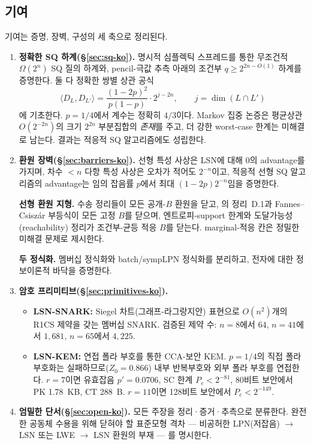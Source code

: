\documentclass[11pt,a4paper]{article}
\theoremstyle{plain}
\theoremstyle{definition}
\begin{document}
\subsection{기여}

기여는 증명, 장벽, 구성의 세 축으로 정리된다.

\begin{enumerate}
\item \textbf{정확한 SQ 하계(\S\ref{sec:sq-ko}).} 명시적 심플렉틱 스프레드를 통한 무조건적 $\Omega(2^n)$ SQ 질의 하계와, pencil-극값 추측 아래의 조건부 $q \ge 2^{2n-O(1)}$ 하계를 증명한다. 둘 다 정확한 쌍별 상관 공식
\[
\langle D_L, D_{L'}\rangle = \frac{(1-2p)^2}{p(1-p)} \cdot 2^{j-2n}, \qquad j = \dim(L \cap L')
\]
에 기초한다. $p=1/4$에서 계수는 정확히 $4/3$이다. Markov 집중 논증은 평균상관 $O(2^{-2n})$의 크기 $2^{2n}$ 부분집합의 \emph{존재}를 주고, 더 강한 worst-case 한계는 미해결로 남는다. 결과는 적응적 SQ 알고리즘에도 성립한다.

\item \textbf{환원 장벽(\S\ref{sec:barriers-ko}).} 선형 특성 사상은 LSN에 대해 0의 advantage를 가지며, 차수 $<n$ 다항 특성 사상은 오차가 적어도 $2^{-n}$이고, 적응적 선형 SQ 알고리즘의 advantage는 임의 잡음률 $p$에서 최대 $(1-2p)2^{-n}$임을 증명한다.

\textbf{선형 환원 지형.} 수송 정리들이 모든 공개-$B$ 환원을 닫고, \cite{LPQR26}의 정리~D.1과 Fannes--Csisz\'ar 부등식이 모든 고정 $B$를 닫으며, 엔트로피-support 한계와 도달가능성(reachability) 정리가 조건부-균등 적응 $B$를 닫는다. marginal-적응 칸은 정밀한 미해결 문제로 제시한다.

\textbf{두 정식화.} 멤버십 정식화와 batch/sympLPN 정식화를 분리하고, 전자에 대한 정보이론적 바닥을 증명한다.

\item \textbf{암호 프리미티브(\S\ref{sec:primitives-ko}).}
\begin{itemize}
\item \textbf{LSN-SNARK:} Siegel 차트(그래프-라그랑지안) 표현으로 $O(n^2)$개의 R1CS 제약을 갖는 멤버십 SNARK. 검증된 제약 수: $n=8$에서 $64$, $n=41$에서 $1{,}681$, $n=65$에서 $4{,}225$.
\item \textbf{LSN-KEM:} 연접 폴라 부호를 통한 CCA-보안 KEM. $p=1/4$의 직접 폴라 부호화는 실패하므로($Z_0 = 0.866$) 내부 반복부호와 외부 폴라 부호를 연접한다. $r=7$이면 유효잡음 $p'=0.0706$, SC 한계 $P_e < 2^{-81}$, 80비트 보안에서 PK 1.78~KB, CT 288~B. $r=11$이면 128비트 보안에서 $P_e < 2^{-149}$.
\end{itemize}

\item \textbf{엄밀한 단서(\S\ref{sec:open-ko}).} 모든 주장을 정리·증거·추측으로 분류한다. 완전한 공동체 수용을 위해 닫혀야 할 표준모형 격차 --- 비공허한 LPN(저잡음) $\to$ LSN 또는 LWE $\to$ LSN 환원의 부재 --- 를 명시한다.
\end{enumerate}
\end{document}
